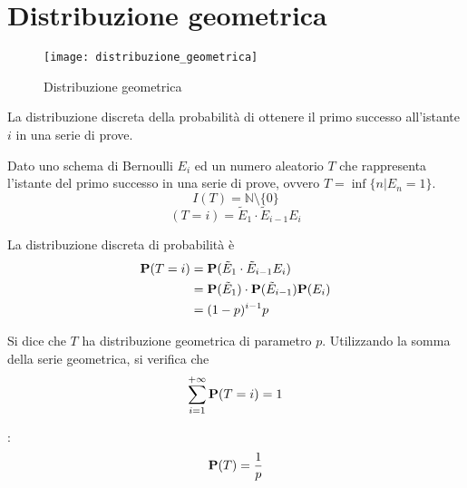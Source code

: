 
\section{Distribuzione geometrica} %
\begin{figure*}
  \texttt{[image: distribuzione\_geometrica]}
  \caption{Distribuzione geometrica} 
\end{figure*}

\begin{definition}\label{def:distribuzione_geometrica}
  La distribuzione discreta della probabilità di ottenere il primo successo all'istante $i$ in una serie di prove.
\end{definition}

Dato uno schema di Bernoulli \( E_i \) ed un numero aleatorio \( T \) che rappresenta l'istante del primo successo in una serie di prove, ovvero \( T = \inf\{ n | E_n = 1 \} \).
\[
  I(T) = \mathbb{N} \setminus \{ 0 \}
\]
\[
  (T = i) = \tilde{E}_1 \cdot \tilde{E}_{i-1} E_i
\]

La distribuzione discreta di probabilità è
\begin{align*}
  \mathbf{P}(T = i) &= \mathbf{P}(\tilde{E}_1 \cdot \tilde{E}_{i-1} E_i) \\
  &= \mathbf{P}(\tilde{E}_1) \cdot \mathbf{P}(\tilde{E}_{i-1}) \mathbf{P}(E_i) \\
  &= (1-p)^{i-1} p  
\end{align*}

Si dice che \( T \) ha distribuzione geometrica di parametro \( p \). Utilizzando 
la somma della serie geometrica, si verifica che
\[
  \sum_{i=1}^{+ \infty} \mathbf{P}(T = i) = 1
\]

:
\[
  \mathbf{P}(T) = \frac{1}{p}
\]

